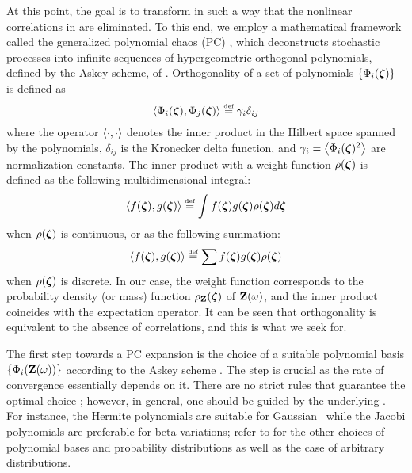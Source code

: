 At this point, the goal is to transform  in such a way that the nonlinear correlations in  are eliminated. To this end, we employ a mathematical framework called the generalized polynomial chaos (PC) \cite{xiu2002}, which deconstructs stochastic processes into infinite sequences of hypergeometric orthogonal polynomials, defined by the Askey scheme, of \rvs. Orthogonality of a set of polynomials $\{ \Phi_i(\boldsymbol{\zeta}) \}$ is defined as
\begin{equation} \elabel{orthogonality}
  \oInner{\pcb_i(\vz)}{\pcb_j(\vz)} \eqdef \pcn_i \delta_{ij}
\end{equation}
where the operator $\oInner{\idot}{\idot}$ denotes the inner product in the Hilbert space spanned by the polynomials, $\delta_{ij}$ is the Kronecker delta function, and $\pcn_i = \oInner{\pcb_i(\vz)^2}$ are normalization constants. The inner product with a weight function $\rho(\boldsymbol{\zeta})$ is defined as the following multidimensional integral:
\begin{equation} \elabel{inner-product-integral}
  \oInner{f(\vz)}{g(\vz)} \eqdef \int f(\vz) g(\vz) \PDF(\vz) d\vz
\end{equation}
when $\rho(\boldsymbol{\zeta})$ is continuous, or as the following summation:
\begin{equation} \elabel{inner-product-sum}
  \oInner{f(\vz)}{g(\vz)} \eqdef \sum f(\vz) g(\vz) \PDF(\vz)
\end{equation}
when $\rho(\boldsymbol{\zeta})$ is discrete. In our case, the weight function corresponds to the probability density (or mass) function $\rho_{\mathbf{Z}}(\boldsymbol{\zeta})$ of $\mathbf{Z}(\omega)$, and the inner product coincides with the expectation operator. It can be seen that orthogonality is equivalent to the absence of correlations, and this is what we seek for.

The first step towards a PC expansion is the choice of a suitable polynomial basis $\{ \Phi_i(\mathbf{Z}(\omega)) \}$ according to the Askey scheme \cite{xiu2002}. The step is crucial as the rate of convergence essentially depends on it. There are no strict rules that guarantee the optimal choice \cite{maitre2010, knio2006}; however, in general, one should be guided by the underlying \rvs. For instance, the Hermite polynomials are suitable for Gaussian \rvs\ while the Jacobi polynomials are preferable for beta variations; refer to \cite{xiu2010, xiu2002} for the other choices of polynomial bases and probability distributions as well as the case of arbitrary distributions.

